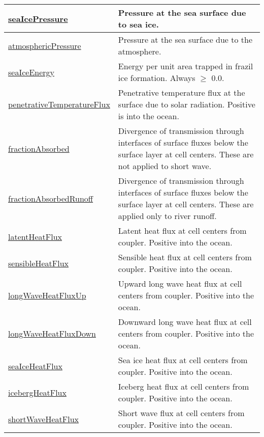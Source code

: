{\begin{center}
\begin{longtable}{| p{2.0in} | p{4.0in} |}
    \hline
    \hyperref[subsec:var_sec_forcing_seaIcePressure]{seaIcePressure} & Pressure at the sea surface due to sea ice. \\
    \hline
    \hyperref[subsec:var_sec_forcing_atmosphericPressure]{atmosphericPressure} & Pressure at the sea surface due to the atmosphere. \\
    \hline
    \hyperref[subsec:var_sec_forcing_seaIceEnergy]{seaIceEnergy} & Energy per unit area trapped in frazil ice formation. Always $\ge$ 0.0. \\
    \hline
    \hyperref[subsec:var_sec_forcing_penetrativeTemperatureFlux]{penetrativeTemperatureFlux} & Penetrative temperature flux at the surface due to solar radiation. Positive is into the ocean. \\
    \hline
    \hyperref[subsec:var_sec_forcing_fractionAbsorbed]{fractionAbsorbed} & Divergence of transmission through interfaces of surface fluxes below the surface layer at cell centers. These are not applied to short wave. \\
    \hline
    \hyperref[subsec:var_sec_forcing_fractionAbsorbedRunoff]{fractionAbsorbedRunoff} & Divergence of transmission through interfaces of surface fluxes below the surface layer at cell centers. These are applied only to river runoff. \\
    \hline
    \hyperref[subsec:var_sec_forcing_latentHeatFlux]{latentHeatFlux} & Latent heat flux at cell centers from coupler. Positive into the ocean. \\
    \hline
    \hyperref[subsec:var_sec_forcing_sensibleHeatFlux]{sensibleHeatFlux} & Sensible heat flux at cell centers from coupler. Positive into the ocean. \\
    \hline
    \hyperref[subsec:var_sec_forcing_longWaveHeatFluxUp]{longWaveHeatFluxUp} & Upward long wave heat flux at cell centers from coupler. Positive into the ocean. \\
    \hline
    \hyperref[subsec:var_sec_forcing_longWaveHeatFluxDown]{longWaveHeatFluxDown} & Downward long wave heat flux at cell centers from coupler. Positive into the ocean. \\
    \hline
    \hyperref[subsec:var_sec_forcing_seaIceHeatFlux]{seaIceHeatFlux} & Sea ice heat flux at cell centers from coupler. Positive into the ocean. \\
    \hline
    \hyperref[subsec:var_sec_forcing_icebergHeatFlux]{icebergHeatFlux} & Iceberg heat flux at cell centers from coupler. Positive into the ocean. \\
    \hline
    \hyperref[subsec:var_sec_forcing_shortWaveHeatFlux]{shortWaveHeatFlux} & Short wave flux at cell centers from coupler. Positive into the ocean. \\

\end{longtable}
\end{center}}
